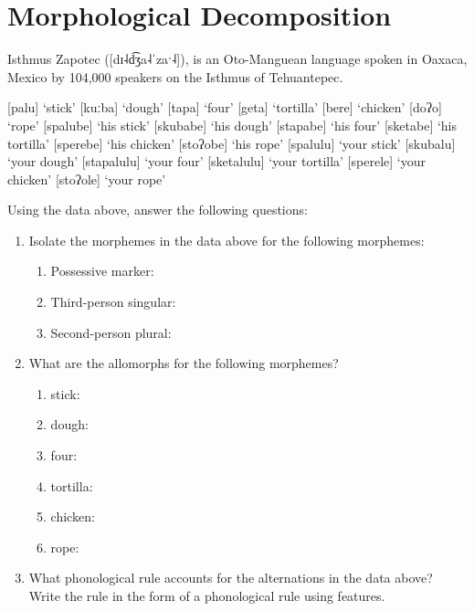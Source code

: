 \documentclass[12pt, letterpaper]{article}
\begin{document}
\section{Morphological Decomposition} 

Isthmus Zapotec ([dɪ˨d͡ʒa˨ˈzaˑ˨]), is an Oto-Manguean language spoken in Oaxaca, Mexico by 104,000 speakers on the Isthmus of Tehuantepec.

\ea
\begin{multicols}{3} 
	\ea {}[palu] `stick'
	\ex {}[kuːba] `dough'
	\ex {}[tapa]	`four'
	\ex {}[geta] `tortilla'
	\ex {}[bere] `chicken'
	\ex {}[doʔo] `rope'
	\ex {}[spalube] `his stick'
	\ex {}[skubabe] `his dough'
	\ex {}[stapabe] `his four'
	\ex {}[sketabe] `his tortilla'
	\ex {}[sperebe] `his chicken'
	\ex {}[stoʔobe] `his rope'
	\ex {}[spalulu] `your stick'
	\ex {}[skubalu] `your dough'
	\ex {}[stapalulu] `your four'
	\ex {}[sketalulu] `your tortilla'
	\ex {}[sperele] `your chicken'
	\ex {}[stoʔole] `your rope'
	\z 
\end{multicols}
\z 

Using the data above, answer the following questions:

\begin{enumerate}
	\item Isolate the morphemes in the data above for the following morphemes:
	\begin{enumerate}
		\item Possessive marker: 
		\item Third-person singular:
		\item Second-person plural:
	\end{enumerate}
	\item What are the allomorphs for the following morphemes?
	\begin{enumerate}
		\item stick: 
		\item dough:
		\item four:
		\item tortilla:
		\item chicken:
		\item rope:
	\end{enumerate}

	\item What phonological rule accounts for the alternations in the data above? Write the rule in the form of a phonological rule using features.
\end{enumerate}

\printbibliography[heading=bibintoc]
\end{document}
